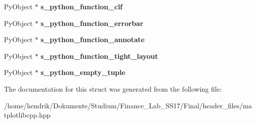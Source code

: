 \begin{DoxyCompactItemize}
\item 
Py\+Object $\ast$ {\bfseries s\+\_\+python\+\_\+function\+\_\+clf}\hypertarget{structmatplotlibcpp_1_1detail_1_1__interpreter_a072f6b7a261385e68f773c3f74622d96}{}\label{structmatplotlibcpp_1_1detail_1_1__interpreter_a072f6b7a261385e68f773c3f74622d96}

\item 
Py\+Object $\ast$ {\bfseries s\+\_\+python\+\_\+function\+\_\+errorbar}\hypertarget{structmatplotlibcpp_1_1detail_1_1__interpreter_a082b7b746d5ebe138b1a136944d0a4ca}{}\label{structmatplotlibcpp_1_1detail_1_1__interpreter_a082b7b746d5ebe138b1a136944d0a4ca}

\item 
Py\+Object $\ast$ {\bfseries s\+\_\+python\+\_\+function\+\_\+annotate}\hypertarget{structmatplotlibcpp_1_1detail_1_1__interpreter_af63d49cff0820f3324b12da812c9a266}{}\label{structmatplotlibcpp_1_1detail_1_1__interpreter_af63d49cff0820f3324b12da812c9a266}

\item 
Py\+Object $\ast$ {\bfseries s\+\_\+python\+\_\+function\+\_\+tight\+\_\+layout}\hypertarget{structmatplotlibcpp_1_1detail_1_1__interpreter_a72965ea88b282bf62b41ca126341d9a8}{}\label{structmatplotlibcpp_1_1detail_1_1__interpreter_a72965ea88b282bf62b41ca126341d9a8}

\item 
Py\+Object $\ast$ {\bfseries s\+\_\+python\+\_\+empty\+\_\+tuple}\hypertarget{structmatplotlibcpp_1_1detail_1_1__interpreter_aaedba936be3a7e8fbcc528991ccace2c}{}\label{structmatplotlibcpp_1_1detail_1_1__interpreter_aaedba936be3a7e8fbcc528991ccace2c}

\end{DoxyCompactItemize}


The documentation for this struct was generated from the following file\+:\begin{DoxyCompactItemize}
\item 
/home/hendrik/\+Dokumente/\+Studium/\+Finance\+\_\+\+Lab\+\_\+\+S\+S17/\+Final/header\+\_\+files/matplotlibcpp.\+hpp\end{DoxyCompactItemize}
